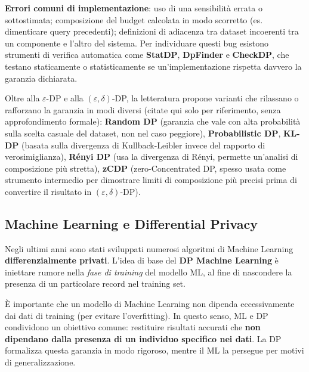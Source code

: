 \documentclass[a4paper,11pt]{article}
\begin{document}
\textbf{Errori comuni di implementazione}: uso di una sensibilit\`{a} errata o sottostimata; composizione del budget calcolata in modo scorretto (es. dimenticare query precedenti); definizioni di adiacenza tra dataset incoerenti tra un componente e l'altro del sistema. Per individuare questi bug esistono strumenti di verifica automatica come \textbf{StatDP}, \textbf{DpFinder} e \textbf{CheckDP}, che testano staticamente o statisticamente se un'implementazione rispetta davvero la garanzia dichiarata.

\begin{nota}
Oltre alla $\varepsilon$-DP e alla $(\varepsilon,\delta)$-DP, la letteratura propone varianti che rilassano o rafforzano la garanzia in modi diversi (citate qui solo per riferimento, senza approfondimento formale): \textbf{Random DP} (garanzia che vale con alta probabilit\`{a} sulla scelta casuale del dataset, non nel caso peggiore), \textbf{Probabilistic DP}, \textbf{KL-DP} (basata sulla divergenza di Kullback-Leibler invece del rapporto di verosimiglianza), \textbf{R\'{e}nyi DP} (usa la divergenza di R\'{e}nyi, permette un'analisi di composizione pi\`{u} stretta), \textbf{zCDP} (zero-Concentrated DP, spesso usata come strumento intermedio per dimostrare limiti di composizione pi\`{u} precisi prima di convertire il risultato in $(\varepsilon,\delta)$-DP).
\end{nota}

\subsection{Machine Learning e Differential Privacy}

Negli ultimi anni sono stati sviluppati numerosi algoritmi di Machine Learning \textbf{differenzialmente privati}. L'idea di base del \textbf{DP Machine Learning} \`{e} iniettare rumore nella \emph{fase di training} del modello ML, al fine di nascondere la presenza di un particolare record nel training set.

\begin{nota}
\`{E} importante che un modello di Machine Learning non dipenda eccessivamente dai dati di training (per evitare l'overfitting). In questo senso, ML e DP condividono un obiettivo comune: restituire risultati accurati che \textbf{non dipendano dalla presenza di un individuo specifico nei dati}. La DP formalizza questa garanzia in modo rigoroso, mentre il ML la persegue per motivi di generalizzazione.
\end{nota}
\end{document}
